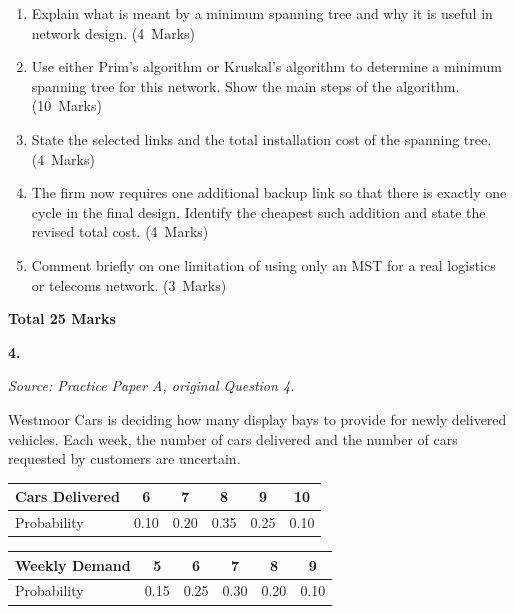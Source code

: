 \documentclass[11pt,a4paper]{article}
\newcommand{\markalloc}[1]{\nobreak\hfill\mbox{(#1 Marks)}}
\newcommand{\questiontotal}[1]{\begin{flushright}\textbf{Total #1 Marks}\end{flushright}}
\begin{document}
\begin{enumerate}
\item Explain what is meant by a minimum spanning tree and why it is useful in network design. \markalloc{4}

\item Use either Prim's algorithm or Kruskal's algorithm to determine a minimum spanning tree for this network. Show the main steps of the algorithm. \markalloc{10}

\item State the selected links and the total installation cost of the spanning tree. \markalloc{4}

\item The firm now requires one additional backup link so that there is exactly one cycle in the final design. Identify the cheapest such addition and state the revised total cost. \markalloc{4}

\item Comment briefly on one limitation of using only an MST for a real logistics or telecoms network. \markalloc{3}
\end{enumerate}

\questiontotal{25}

\newpage

\textbf{4.}

\textit{Source: Practice Paper A, original Question 4.}



Westmoor Cars is deciding how many display bays to provide for newly delivered vehicles.
Each week, the number of cars delivered and the number of cars requested by customers are uncertain.

\begin{center}
\begin{tabular}{lccccc}
\toprule
Cars Delivered & 6 & 7 & 8 & 9 & 10 \\
\midrule
Probability & 0.10 & 0.20 & 0.35 & 0.25 & 0.10 \\
\bottomrule
\end{tabular}
\end{center}

\begin{center}
\begin{tabular}{lccccc}
\toprule
Weekly Demand & 5 & 6 & 7 & 8 & 9 \\
\midrule
Probability & 0.15 & 0.25 & 0.30 & 0.20 & 0.10 \\
\bottomrule
\end{tabular}
\end{center}
\end{document}
